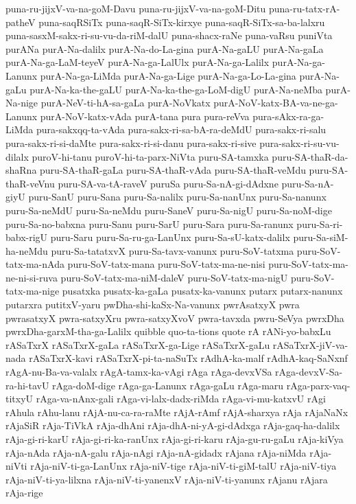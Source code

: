{puna-ru-jijxV-va-na-goM-Davu
puna-ru-jijxV-va-na-goM-Ditu
puna-ru-tatx-rA-patheV
puna-saqRSiTx
puna-saqR-SiTx-kirxye
puna-saqR-SiTx-sa-ba-lalxru
puna-sasxM-sakx-ri-su-vu-da-riM-dalU
puna-shacx-raNe
puna-vaRsu
puniVta
purANa
purA-Na-dalilx
purA-Na-do-La-gina
purA-Na-gaLU
purA-Na-gaLa
purA-Na-ga-LaM-teyeV
purA-Na-ga-LalUlx
purA-Na-ga-Lalilx
purA-Na-ga-Lanunx
purA-Na-ga-LiMda
purA-Na-ga-Lige
purA-Na-ga-Lo-La-gina
purA-Na-gaLu
purA-Na-ka-the-gaLU
purA-Na-ka-the-ga-LoM-digU
purA-Na-neMba
purA-Na-nige
purA-NeV-ti-hA-sa-gaLa
purA-NoVkatx
purA-NoV-katx-BA-va-ne-ga-Lanunx
purA-NoV-katx-vAda
purA-tana
pura
pura-reVva
pura-sAkx-ra-ga-LiMda
pura-sakxqq-ta-vAda
pura-sakx-ri-sa-bA-ra-deMdU
pura-sakx-ri-salu
pura-sakx-ri-si-daMte
pura-sakx-ri-si-danu
pura-sakx-ri-sive
pura-sakx-ri-su-vu-dilalx
puroV-hi-tanu
puroV-hi-ta-parx-NiVta
puru-SA-tamxka
puru-SA-thaR-da-shaRna
puru-SA-thaR-gaLa
puru-SA-thaR-vAda
puru-SA-thaR-veMdu
puru-SA-thaR-veVnu
puru-SA-va-tA-raveV
puruSa
puru-Sa-nA-gi-dAdxne
puru-Sa-nA-giyU
puru-SanU
puru-Sana
puru-Sa-nalilx
puru-Sa-nanUnx
puru-Sa-nanunx
puru-Sa-neMdU
puru-Sa-neMdu
puru-SaneV
puru-Sa-nigU
puru-Sa-noM-dige
puru-Sa-no-babxna
puru-Sanu
puru-SarU
puru-Sara
puru-Sa-ranunx
puru-Sa-ri-babx-rigU
puru-Saru
puru-Sa-ru-ga-LanUnx
puru-Sa-sU-katx-dalilx
puru-Sa-siM-ha-neMdu
puru-Sa-tatatxvX
puru-Sa-tavx-vanunx
puru-SoV-tatxma
puru-SoV-tatx-ma-nAda
puru-SoV-tatx-mana
puru-SoV-tatx-ma-ne-nisi
puru-SoV-tatx-ma-ne-ni-si-ruva
puru-SoV-tatx-ma-niM-daleV
puru-SoV-tatx-ma-nigU
puru-SoV-tatx-ma-nige
pusatxka
pusatx-ka-gaLa
pusatx-ka-vanunx
putarx
putarx-nanunx
putarxra
putitxV-yaru
pwDha-shi-kaSx-Na-vanunx
pwrAsatxyX
pwra
pwrasatxyX
pwra-satxyXru
pwra-satxyXvoV
pwra-tavxda
pwru-SeVya
pwrxDha
pwrxDha-garxM-tha-ga-Lalilx
quibble
quo-ta-tions
quote
rA
rANi-yo-babxLu
rASaTxrX
rASaTxrX-gaLa
rASaTxrX-ga-Lige
rASaTxrX-gaLu
rASaTxrX-jiV-va-nada
rASaTxrX-kavi
rASaTxrX-pi-ta-naSuTx
rAdhA-ka-malf
rAdhA-kaq-SaNxnf
rAgA-nu-Ba-va-valalx
rAgA-tamx-ka-vAgi
rAga
rAga-devxVSa
rAga-devxV-Sa-ra-hi-tavU
rAga-doM-dige
rAga-ga-Lanunx
rAga-gaLu
rAga-maru
rAga-parx-vaq-titxyU
rAga-va-nAnx-gali
rAga-vi-lalx-dadx-riMda
rAga-vi-mu-katxvU
rAgi
rAhula
rAhu-lanu
rAjA-nu-ca-ra-raMte
rAjA-rAmf
rAjA-sharxya
rAja
rAjaNaNx
rAjaSiR
rAja-TiVkA
rAja-dhAni
rAja-dhA-ni-yA-gi-dAdxga
rAja-gaq-ha-dalilx
rAja-gi-ri-karU
rAja-gi-ri-ka-ranUnx
rAja-gi-ri-karu
rAja-gu-ru-gaLu
rAja-kiVya
rAja-nAda
rAja-nA-galu
rAja-nAgi
rAja-nA-gidadx
rAjana
rAja-niMda
rAja-niVti
rAja-niV-ti-ga-LanUnx
rAja-niV-tige
rAja-niV-ti-giM-talU
rAja-niV-tiya
rAja-niV-ti-ya-lilxna
rAja-niV-ti-yanenxV
rAja-niV-ti-yanunx
rAjanu
rAjara
rAja-rige
}
